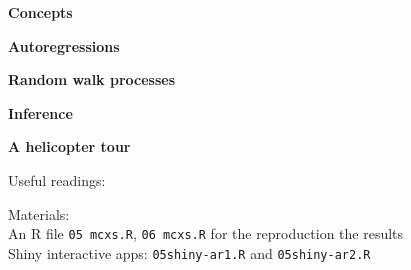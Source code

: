 \documentclass[notes,blackandwhite,mathsans]{beamer}
\begin{document}
{
\begin{frame}

\vspace{1cm} \textbf{\color{mcxs2}Concepts}

\bigskip\textbf{\color{mcxs2}Autoregressions}

\bigskip\textbf{\color{mcxs1}Random walk processes}

\bigskip\textbf{\color{mcxs1}Inference}

\bigskip\textbf{\color{mcxs1}A helicopter tour}


\small
\vspace{1cm} Useful readings: \\ \footnotesize
{}

\bigskip\normalsize Materials:\\[1ex] \footnotesize
{\color{mcxs2}An R file} \texttt{05 mcxs.R}, \texttt{06 mcxs.R} {\color{mcxs2}for the reproduction the results}\\
{\color{mcxs2}Shiny interactive apps:} \texttt{05shiny-ar1.R} {\color{mcxs2}and} \texttt{05shiny-ar2.R}

\end{frame}
}



%
%
%
\end{document}
